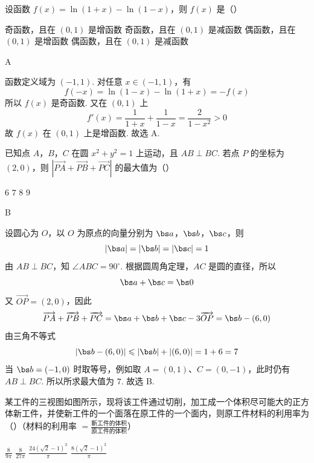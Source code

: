 \begin{problem}
设函数 \( f(x) = \ln (1 + x) - \ln (1 - x) \)，则 \( f(x) \) 是（\quad）

\choices
    {奇函数，且在 \((0,1)\) 是增函数}
    {奇函数，且在 \((0,1)\) 是减函数}
    {偶函数，且在 \((0,1)\) 是增函数}
    {偶函数，且在 \((0,1)\) 是减函数}
\end{problem}

\begin{answer}
A
\end{answer}

\begin{solution}
函数定义域为 \((-1,1)\). 对任意 \(x\in(-1,1)\)，有
\[
f(-x)=\ln(1-x)-\ln(1+x)=-f(x)
\]
所以 \(f(x)\) 是奇函数. 又在 \((0,1)\) 上
\[
f'(x)=\frac{1}{1+x}+\frac{1}{1-x}=\frac{2}{1-x^2}>0
\]
故 \(f(x)\) 在 \((0,1)\) 上是增函数. 故选 A.
\end{solution}

\begin{problem}
已知点 \(A\)，\(B\)，\(C\) 在圆 \(x^{2} + y^{2} = 1\) 上运动，且 \(AB \perp BC\). 若点 \(P\) 的坐标为 \((2,0)\)，则 \(\left|\overrightarrow{PA} + \overrightarrow{PB} + \overrightarrow{PC}\right|\) 的最大值为（\quad）

\choices
    {\(6\)}
    {\(7\)}
    {\(8\)}
    {\(9\)}
\end{problem}

\begin{answer}
B
\end{answer}

\begin{solution}
设圆心为 \(O\)，以 \(O\) 为原点的向量分别为 \(\bs a\)，\(\bs b\)，\(\bs c\)，则
\[
|\bs a|=|\bs b|=|\bs c|=1
\]
由 \(AB\perp BC\)，知 \(\angle ABC=90^{\circ}\). 根据圆周角定理，\(AC\) 是圆的直径，所以
\[
\bs a+\bs c=\bs0
\]
又 \(\overrightarrow{OP}=(2,0)\)，因此
\[
\overrightarrow{PA}+\overrightarrow{PB}+\overrightarrow{PC}
 =\bs a+\bs b+\bs c-3\overrightarrow{OP}
 =\bs b-(6,0)
\]
由三角不等式
\[
\left|\bs b-(6,0)\right|\leqslant|\bs b|+|(6,0)|=1+6=7
\]
当 \(\bs b=(-1,0)\) 时取等号，例如取 \(A=(0,1)\)、\(C=(0,-1)\)，此时仍有 \(AB\perp BC\). 所以所求最大值为 \(7\). 故选 B.
\end{solution}

\begin{problem}
某工件的三视图如图所示，现将该工件通过切削，加工成一个体积尽可能大的正方体新工件，并使新工件的一个面落在原工件的一个面内，则原工件材料的利用率为（\quad）（材料的利用率 \(=\frac{\text{新工件的体积}}{\text{原工件的体积}}\)）


\choices
    {\(\frac{8}{9\pi}\)}
    {\(\frac{8}{27\pi}\)}
    {\(\frac{24(\sqrt{2} - 1)^3}{\pi}\)}
    {\(\frac{8(\sqrt{2} - 1)^3}{\pi}\)}
\end{problem}

